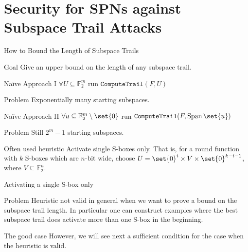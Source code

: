 \documentclass[%
    10pt,
    professionalfont,
    aspectratio=169,
    handout,
]{beamer}
\newcommand{\F}{\mathbb{F}}
\DeclareMathOperator{\SpanOp}{Span}
\newcommand{\Span}[1]{\SpanOp\set{#1}}
\begin{document}
\section{Security for SPNs against Subspace Trail Attacks}
\begin{frame}{How to Bound the Length of Subspace Trails}
    \centering
    \begin{block}{Goal}
        Give an upper bound on the length of any subspace trail.
    \end{block}
    \pause

    \begin{minipage}{0.45\textwidth}
    \begin{block}{Na\"ive Approach I}
        $\forall U \subseteq \F_2^m$ run $\texttt{ComputeTrail}(F, U)$
    \end{block}
    \begin{alertblock}{Problem}
        Exponentially many starting subspaces.
    \end{alertblock}
    \end{minipage}%
    \pause%
    \hspace{5pt}%
    \begin{minipage}{0.48\textwidth}
    \begin{block}{Na\"ive Approach II}
        $\forall u \subseteq \F_2^m \setminus \set{0}$ run $\texttt{ComputeTrail}(F, \Span{u})$
    \end{block}
    \begin{alertblock}{Problem}
        Still $2^m-1$ starting subspaces.
    \end{alertblock}
    \end{minipage}
    \pause

    \begin{block}{Often used heuristic}
        Activate single S-boxes only.
        That is, for a round function with $k$ S-boxes which are $n$-bit wide, choose $U = \set{0}^i \times V \times \set{0}^{k-i-1}$, where $V \subseteq \F_2^n$.
    \end{block}
\end{frame}

\begin{frame}{Activating a single S-box only}
    \begin{alertblock}{Problem}
        Heuristic not valid in general when we want to prove a bound on the subspace trail length.
        In particular one can construct examples where the best subspace trail does activate more than one S-box in the beginning.
    \end{alertblock}
    \begin{exampleblock}{The good case}
        However, we will see next a sufficient condition for the case when the heuristic is valid.
    \end{exampleblock}
\end{frame}
\end{document}

